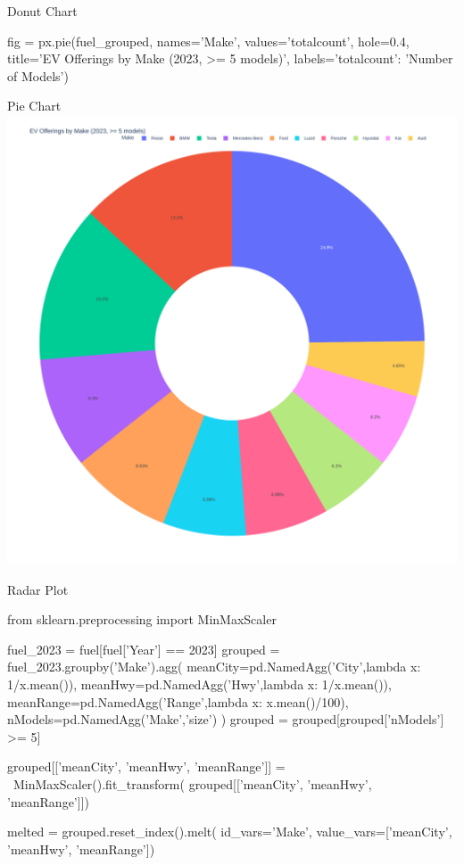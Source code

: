 \documentclass[ignorenonframetext,xcolor=x11names]{beamer}
\begin{document}
\begin{frame}[fragile]{Donut Chart}
\footnotesize
\begin{pythoncode}
fig = px.pie(fuel_grouped, 
    names='Make', values='totalcount', hole=0.4,
    title='EV Offerings by Make (2023, >= 5 models)',
    labels={'totalcount': 'Number of Models'})
\end{pythoncode}
\end{frame}

\begin{frame}{Pie Chart}
\centering
  \includegraphics[width=.8\textwidth]{px.fuel.donut.pdf}
\end{frame}


\begin{frame}[fragile]{Radar Plot}
\footnotesize
\begin{pythoncode}
from sklearn.preprocessing import MinMaxScaler

fuel_2023 = fuel[fuel['Year'] == 2023]
grouped = fuel_2023.groupby('Make').agg(
    meanCity=pd.NamedAgg('City',lambda x: 1/x.mean()),
    meanHwy=pd.NamedAgg('Hwy',lambda x: 1/x.mean()),
    meanRange=pd.NamedAgg('Range',lambda x: x.mean()/100),
    nModels=pd.NamedAgg('Make','size')
)
grouped = grouped[grouped['nModels'] >= 5]

grouped[['meanCity', 'meanHwy', 'meanRange']] = \
   MinMaxScaler().fit_transform(
      grouped[['meanCity', 'meanHwy', 'meanRange']])

melted = grouped.reset_index().melt(
    id_vars='Make', 
     value_vars=['meanCity', 'meanHwy', 'meanRange'])
\end{pythoncode}
\end{frame}
\end{document}

